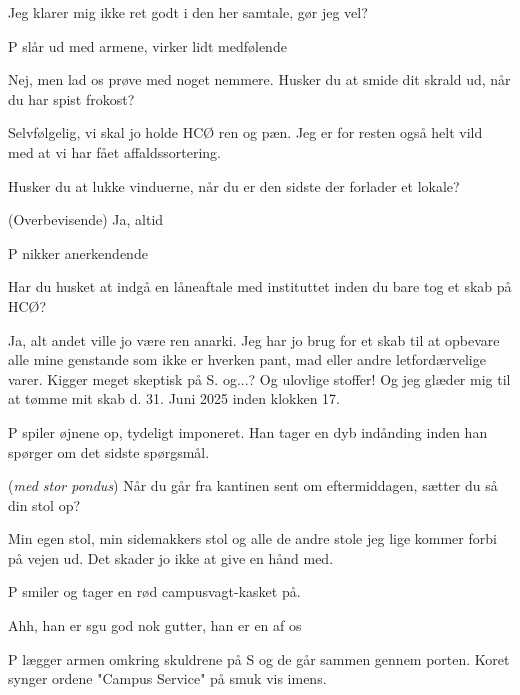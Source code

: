 \documentclass[a4paper,11pt]{article}
\begin{document}
\begin{sketch}
 Jeg klarer mig ikke ret godt i den her samtale, gør jeg vel?

\scene P slår ud med armene, virker lidt medfølende

 Nej, men lad os prøve med noget nemmere. Husker du at smide dit skrald ud, når du har spist frokost?

 Selvfølgelig, vi skal jo holde HCØ ren og pæn. Jeg er for resten også helt vild med at vi har fået affaldssortering. 

 Husker du at lukke vinduerne, når du er den sidste der forlader et lokale?

 (Overbevisende) Ja, altid

\scene P nikker anerkendende

 Har du husket at indgå en låneaftale med instituttet inden du bare tog et skab på HCØ?

 Ja, alt andet ville jo være ren anarki. Jeg har jo brug for et skab til at opbevare alle mine genstande som ikke er hverken pant, mad eller andre letfordærvelige varer.
 Kigger meget skeptisk på S.
 og...?
 Og ulovlige stoffer! Og jeg glæder mig til at tømme mit skab d. 31. Juni 2025 inden klokken 17.

\scene P spiler øjnene op, tydeligt imponeret. Han tager en dyb indånding inden han spørger om det sidste spørgsmål.

 (\textit{med stor pondus}) Når du går fra kantinen sent om eftermiddagen, sætter du så din stol op?

 Min egen stol, min sidemakkers stol og alle de andre stole jeg lige kommer forbi på vejen ud. Det skader jo ikke at give en hånd med.

\scene P smiler og tager en rød campusvagt-kasket på. 

 Ahh, han er sgu god nok gutter, han er en af os

\scene P lægger armen omkring skuldrene på S og de går sammen gennem porten. Koret synger ordene "Campus Service" på smuk vis imens.
\end{sketch}
\end{document}
